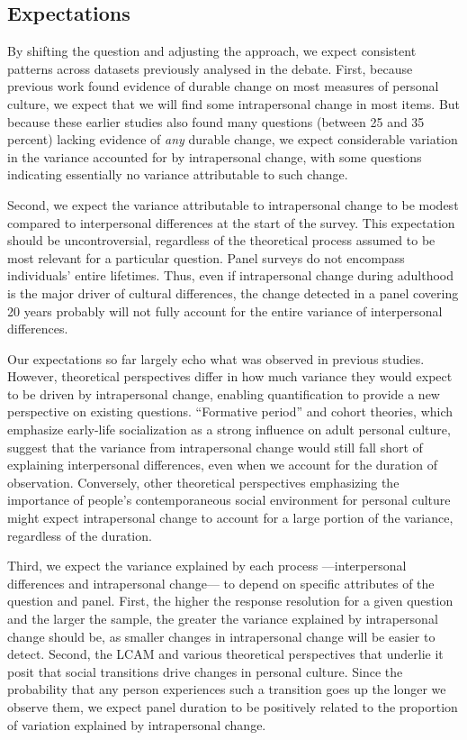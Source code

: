 \documentclass[
  12pt,
]{article}
\begin{document}
\hypertarget{expectations}{%
\subsection{Expectations}\label{expectations}}

By shifting the question and adjusting the approach, we expect
consistent patterns across datasets previously analysed in the debate.
First, because previous work found evidence of durable change on most
measures of personal culture, we expect that we will find some
intrapersonal change in most items. But because these earlier studies
also found many questions (between 25 and 35 percent) lacking evidence
of \emph{any} durable change, we expect considerable variation in the
variance accounted for by intrapersonal change, with some questions
indicating essentially no variance attributable to such change.

Second, we expect the variance attributable to intrapersonal change to
be modest compared to interpersonal differences at the start of the
survey. This expectation should be uncontroversial, regardless of the
theoretical process assumed to be most relevant for a particular
question. Panel surveys do not encompass individuals' entire lifetimes.
Thus, even if intrapersonal change during adulthood is the major driver
of cultural differences, the change detected in a panel covering 20
years probably will not fully account for the entire variance of
interpersonal differences.

Our expectations so far largely echo what was observed in previous
studies. However, theoretical perspectives differ in how much variance
they would expect to be driven by intrapersonal change, enabling
quantification to provide a new perspective on existing questions.
``Formative period'' and cohort theories, which emphasize early-life
socialization as a strong influence on adult personal culture, suggest
that the variance from intrapersonal change would still fall short of
explaining interpersonal differences, even when we account for the
duration of observation. Conversely, other theoretical perspectives
emphasizing the importance of people's contemporaneous social
environment for personal culture might expect intrapersonal change to
account for a large portion of the variance, regardless of the duration.

Third, we expect the variance explained by each process ---interpersonal
differences and intrapersonal change--- to depend on specific attributes
of the question and panel. First, the higher the response resolution for
a given question and the larger the sample, the greater the variance
explained by intrapersonal change should be, as smaller changes in
intrapersonal change will be easier to detect. Second, the LCAM and
various theoretical perspectives that underlie it posit that social
transitions drive changes in personal culture. Since the probability
that any person experiences such a transition goes up the longer we
observe them, we expect panel duration to be positively related to the
proportion of variation explained by intrapersonal change.
\end{document}
